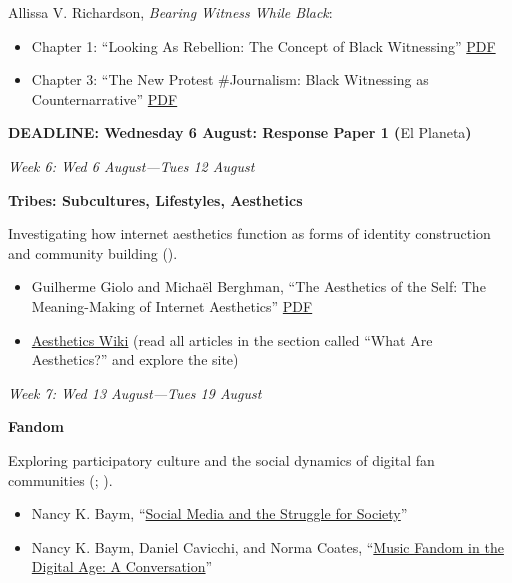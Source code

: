 \documentclass[
  letterpaper,
  DIV=11,
  numbers=noendperiod]{scrartcl}
\providecommand{\tightlist}{%
  \setlength{\itemsep}{0pt}\setlength{\parskip}{0pt}}
\begin{document}
Allissa V. Richardson, \emph{Bearing Witness While Black}:

\begin{itemize}
\tightlist
\item
  Chapter 1: ``Looking As Rebellion: The Concept of Black Witnessing''
  \href{pdf/richardson-bearing-witness-ch1.pdf}{PDF}
\item
  Chapter 3: ``The New Protest \#Journalism: Black Witnessing as
  Counternarrative'' \href{richardson-bearing-witness-ch3.pdf}{PDF}
\end{itemize}

\textbf{DEADLINE: Wednesday 6 August: Response Paper 1 (}El
Planeta\textbf{)}

\emph{Week 6: Wed 6 August---Tues 12 August}

\textbf{Tribes: Subcultures, Lifestyles, Aesthetics}

Investigating how internet aesthetics function as forms of identity
construction and community building
().

\begin{itemize}
\tightlist
\item
  Guilherme Giolo and Michaël Berghman, ``The Aesthetics of the Self:
  The Meaning-Making of Internet Aesthetics''
  \href{pdf/giolo-berghman-aesthetics.pdf}{PDF}
\item
  \href{https://aesthetics.fandom.com/wiki/Aesthetics_Wiki}{Aesthetics
  Wiki} (read all articles in the section called ``What Are
  Aesthetics?'' and explore the site)
\end{itemize}

\emph{Week 7: Wed 13 August---Tues 19 August}

\textbf{Fandom}

Exploring participatory culture and the social dynamics of digital fan
communities (;
).

\begin{itemize}
\tightlist
\item
  Nancy K. Baym, ``\href{pdf/baym-social-media-society.pdf}{Social Media
  and the Struggle for Society}''\\
\item
  Nancy K. Baym, Daniel Cavicchi, and Norma Coates,
  ``\href{pdf/baym-music-fandom.pdf}{Music Fandom in the Digital Age: A
  Conversation}''
\end{itemize}
\end{document}
